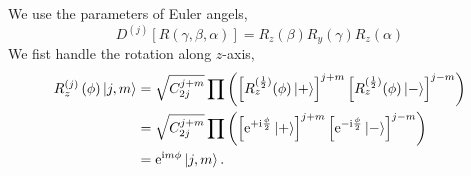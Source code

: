 We use the parameters of Euler angels, 
\begin{equation}
  D^{(j)} \left[ R\left( \gamma, \beta, \alpha \right) \right] = R_{z} \left( \beta \right) R_{y} \left( \gamma \right) R_{z} \left( \alpha \right)
\end{equation}
We fist handle the rotation along $z$-axis, 
\begin{equation}
\begin{aligned}
  R^{(j)}_{z} \left( \phi  \right) \ket{j,m} & = \sqrt{C_{2j}^{j+m}} \prod \left( \left[ R_{z}^{(\frac{1}{2})} (\phi) \ket{+}\right]^{j+m} \left[ R_{z}^{(\frac{1}{2})} (\phi) \ket{-}\right]^{j-m} \right)
  \\
  & = \sqrt{C_{2j}^{j+m}} \prod \left( \left[ \mathrm{e}^{+ \mathrm{i} \frac{\phi }{2}} \ket{+} \right]^{j+m} \left[ \mathrm{e}^{- \mathrm{i} \frac{\phi }{2}} \ket{-} \right]^{j-m}\right)
  \\
  & = \mathrm{e}^{\mathrm{i} m \phi } \ket{j, m}.
\end{aligned}
\end{equation}
